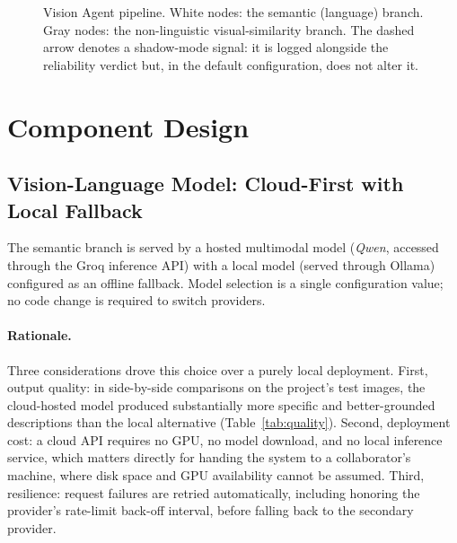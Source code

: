\documentclass[11pt, a4paper]{article}
\begin{document}
\begin{figure}[h]
\caption{Vision Agent pipeline. White nodes: the semantic (language) branch. Gray nodes: the
non-linguistic visual-similarity branch. The dashed arrow denotes a shadow-mode signal: it is
logged alongside the reliability verdict but, in the default configuration, does not alter it.}
\label{fig:arch}
\end{figure}

\section{Component Design}

\subsection{Vision-Language Model: Cloud-First with Local Fallback}

The semantic branch is served by a hosted multimodal model (\emph{Qwen}, accessed through the
Groq inference API) with a local model (served through Ollama) configured as an offline
fallback. Model selection is a single configuration value; no code change is required to
switch providers.

\paragraph{Rationale.} Three considerations drove this choice over a purely local deployment.
First, output quality: in side-by-side comparisons on the project's test images, the
cloud-hosted model produced substantially more specific and better-grounded descriptions than
the local alternative (Table~\ref{tab:quality}). Second, deployment cost: a cloud API requires
no GPU, no model download, and no local inference service, which matters directly for handing
the system to a collaborator's machine, where disk space and GPU availability cannot be
assumed. Third, resilience: request failures are retried automatically, including honoring the
provider's rate-limit back-off interval, before falling back to the secondary provider.
\end{document}

